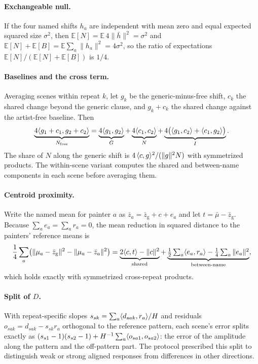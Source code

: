\paragraph{Exchangeable null.} If the four named shifts $h_a$ are independent with mean zero and
equal expected squared size $\sigma^2$, then $\mathbb E[N]=\mathbb E\,4\|\bar h\|^2=\sigma^2$ and
$\mathbb E[N]+\mathbb E[B]=\mathbb E\sum_a\|h_a\|^2=4\sigma^2$, so the ratio of expectations
$\mathbb E[N]/(\mathbb E[N]+\mathbb E[B])$ is $1/4$.

\paragraph{Baselines and the cross term.} Averaging scenes within repeat $k$, let $g_k$ be the
generic-minus-free shift, $c_k$ the shared change beyond the generic clause, and $g_k+c_k$ the
shared change against the artist-free baseline. Then
\begin{equation}
\underbrace{4\langle g_1+c_1,g_2+c_2\rangle}_{N_{\mathrm{free}}}=\underbrace{4\langle g_1,g_2\rangle}_{G}
+\underbrace{4\langle c_1,c_2\rangle}_{N}
+\underbrace{4\bigl(\langle g_1,c_2\rangle+\langle c_1,g_2\rangle\bigr)}_{I}.
\end{equation}
The share of $N$ along the generic shift is $4\,\langle c,g\rangle^2/(\|g\|^2N)$ with symmetrized
products. The within-scene variant computes the shared and between-name components in each
scene before averaging them.

\paragraph{Centroid proximity.} Write the named mean for painter $a$ as $\bar z_a=\bar
z_{\mathrm{g}}+c+e_a$ and let $t=\bar\mu-\bar z_{\mathrm{g}}$. Because $\sum_ae_a=\sum_ar_a=0$,
the mean reduction in squared distance to the painters' reference means is
\begin{equation}
\frac14\sum_a\bigl(\|\mu_a-\bar z_{\mathrm{g}}\|^2-\|\mu_a-\bar z_a\|^2\bigr)
=\underbrace{2\langle c,t\rangle-\|c\|^2}_{\text{shared}}
+\underbrace{\tfrac12\textstyle\sum_a\langle e_a,r_a\rangle-\tfrac14\sum_a\|e_a\|^2}_{\text{between-name}},
\end{equation}
which holds exactly with symmetrized cross-repeat products.

\paragraph{Split of $D$.} With repeat-specific slopes $s_{sk}=\sum_a\langle d_{sak},r_a\rangle/H$ and
residuals $o_{sak}=d_{sak}-s_{sk}r_a$ orthogonal to the reference pattern, each scene's error splits
exactly as $(s_{s1}-1)(s_{s2}-1)+H^{-1}\sum_a\langle o_{sa1},o_{sa2}\rangle$: the error of the amplitude along
the pattern and the off-pattern part. The protocol prescribed this split to distinguish weak or
strong aligned responses from differences in other directions.

